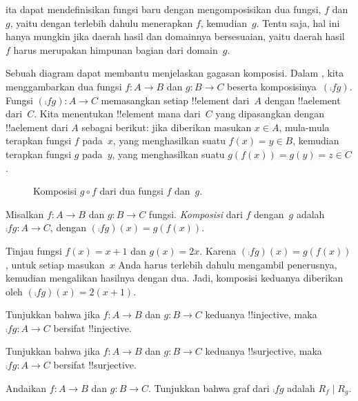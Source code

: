 \documentclass[../../../include/open-logic-section]{subfiles}
\begin{document}

\begin{explain}
ita dapat mendefinisikan fungsi baru dengan
mengomposisikan dua fungsi, $f$ dan~$g$, yaitu dengan terlebih dahulu
menerapkan $f$, kemudian~$g$. Tentu saja, hal ini hanya mungkin jika daerah
hasil dan domainnya bersesuaian, yaitu daerah hasil~$f$ harus merupakan
himpunan bagian dari domain~$g$. 

Sebuah diagram dapat membantu menjelaskan gagasan komposisi. Dalam
, kita menggambarkan dua fungsi $f \colon A \to B$ dan
$g \colon B \to C$ beserta komposisinya~$(\comp{f}{g})$. Fungsi
$(\comp{f}{g}) \colon A \to C$ memasangkan setiap !!{element} dari~$A$ dengan
!!a{element} dari~$C$. Kita menentukan !!{element} mana dari~$C$ yang
dipasangkan dengan !!a{element} dari $A$ sebagai berikut: jika diberikan
masukan $x \in A$, mula-mula terapkan fungsi $f$ pada~$x$, yang menghasilkan
suatu $f(x) = y \in B$, kemudian terapkan fungsi $g$ pada~$y$, yang
menghasilkan suatu $g(f(x)) = g(y) = z \in C$.
\begin{figure}
  \caption{Komposisi $g \circ f$ dari dua fungsi $f$ dan~$g$.}
\end{figure}
\end{explain}

\begin{defn}[Komposisi]
Misalkan $f\colon A \to B$ dan $g\colon B \to C$ fungsi. \emph{Komposisi}
dari $f$ dengan~$g$ adalah $\comp{f}{g} \colon A \to C$, dengan
$(\comp{f}{g})(x) = g(f(x))$.
\end{defn}

\begin{ex}
Tinjau fungsi $f(x) = x + 1$ dan $g(x) = 2x$. Karena
$(\comp{f}{g})(x) = g(f(x))$, untuk setiap masukan~$x$ Anda harus terlebih
dahulu mengambil penerusnya, kemudian mengalikan hasilnya dengan dua. Jadi,
komposisi keduanya diberikan oleh $(\comp{f}{g})(x) = 2(x+1)$.
\end{ex}

\begin{prob}
Tunjukkan bahwa jika $f \colon A \to B$ dan $g \colon B \to C$ keduanya
!!{injective}, maka $\comp{f}{g}\colon A \to C$ bersifat !!{injective}.
\end{prob}

\begin{prob}
Tunjukkan bahwa jika $f \colon A \to B$ dan $g \colon B \to C$ keduanya
!!{surjective}, maka $\comp{f}{g}\colon A \to C$ bersifat !!{surjective}.
\end{prob}

\begin{prob}
Andaikan $f \colon A \to B$ dan $g \colon B \to C$. Tunjukkan bahwa graf
dari $\comp{f}{g}$ adalah $R_f \mid R_g$.
\end{prob}
\end{document}
